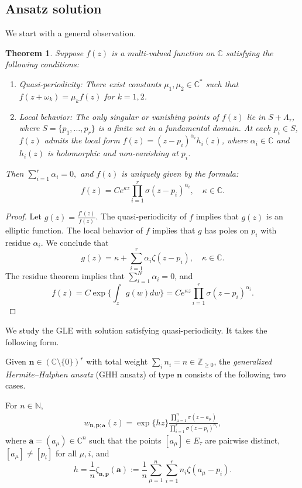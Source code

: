 \documentclass[11pt]{amsart}
\newtheorem{theorem}{Theorem}[section]
\theoremstyle{remark}
\numberwithin{equation}{section}
\begin{document}
\subsection{Ansatz solution} \label{ss:ansatz}
We start with a general observation.
\begin{theorem} \label{t:double_multi_sol}
Suppose $f(z)$ is a multi-valued function on $\mathbb{C}$ satisfying the following conditions:
\begin{enumerate}
\item Quasi-periodicity: There exist constants $\mu_1, \mu_2 \in \mathbb{C}^*$ such that $f(z+\omega_k) = \mu_k f(z)$ for $k=1,2$.
\item Local behavior: The only singular or vanishing points of $f(z)$ lie in $S + \Lambda_\tau$, where $S = \{p_1, \dots, p_r\}$ is a finite set in a fundamental domain. At each $p_i \in S$, $f(z)$ admits the local form $f(z) = (z-p_i)^{\alpha_i} h_i(z)$, where $\alpha_i \in \mathbb{C}$ and $h_i(z)$ is holomorphic and non-vanishing at $p_i$.
\end{enumerate}
Then
$
\sum_{i=1}^r \alpha_i = 0,
$
and $f(z)$ is uniquely given by the formula:
\[
    f(z) = C e^{\kappa z} \prod_{i=1}^r \sigma(z-p_i)^{\alpha_i}, \quad \kappa \in \mathbb{C}.
\]
\end{theorem}
\begin{proof}
Let $g(z) = \frac{f'(z)}{f(z)}$. The quasi-periodicity of $f$ implies that $g(z)$ is an elliptic function. The local behavior of $f$ implies that $g$ has poles on $p_i$ with residue $\alpha_i$. We conclude that 
\[
    g(z) = \kappa + \sum_{i=1}^r \alpha_i \zeta(z-p_i), \quad \kappa \in \mathbb{C}.
\]
The residue theorem implies that $\sum_{i=1}^N \alpha_i =0$, and 
\[
    f(z) =  C \exp\Big\{ \int_z g(w)dw  \Big\} = C e^{\kappa z} \prod_{i=1}^r \sigma(z-p_i)^{\alpha_i}. 
\]
\end{proof}

We study the GLE with solution satisfying quasi-periodicity. It takes the following form. 

Given $\mathbf{n} \in (\mathbb{C}\setminus \{0\})^r$ with total weight $\sum_i n_i = n \in \mathbb{Z}_{ \geq  0}$, the \textit{generalized Hermite--Halphen ansatz} (GHH ansatz) of type $\mathbf{n}$ consists of the following two cases. 

For $n\in \mathbb{N}$, 
\begin{equation} \label{e:GHH}
\begin{split}
w_{\mathbf{n},\mathbf{p}; \mathbf{a}}(z) = \exp \{hz\}\frac{\displaystyle\prod_{\mu = 1}^n \sigma(z - a_\mu)}{\displaystyle\prod_{i = 1}^{r}\sigma(z - p_i)^{n_i}},
\end{split}
\end{equation}
where $\mathbf{a} = (a_\mu) \in \mathbb{C}^n$ such that the points $[a_\mu] \in E_\tau$ are pairwise distinct, $[a_\mu] \neq [p_i]$ for all $\mu, i$, and
\begin{equation} \label{e:AP}
h = \frac{1}{n}\zeta_{\mathbf{n},\mathbf{p}}(\mathbf{a}) := \frac{1}{n} \sum_{\mu = 1}^n \sum_{i = 1}^{r} n_i \zeta(a_\mu - p_i). 
\end{equation}
\end{document}
